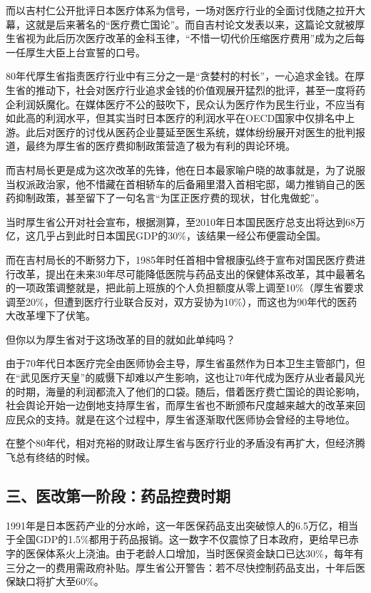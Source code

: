 而以吉村仁公开批评日本医疗体系为信号，一场对医疗行业的全面讨伐随之拉开大幕，这就是后来著名的“医疗费亡国论”。而自吉村论文发表以来，这篇论文就被厚生省视为此后历次医疗改革的金科玉律，“不惜一切代价压缩医疗费用”成为之后每一任厚生大臣上台宣誓的口号。

80年代厚生省指责医疗行业中有三分之一是“贪婪村的村长”，一心追求金钱。在厚生省的推动下，社会对医疗行业追求金钱的价值观展开猛烈的批评，甚至一度将药企利润妖魔化。在媒体医疗不公的鼓吹下，民众认为医疗作为民生行业，不应当有如此高的利润水平，但其实当时日本医疗的利润水平在OECD国家中仅排名中上游。此后对医疗的讨伐从医药企业蔓延至医生系统，媒体纷纷展开对医生的批判报道，最终为厚生省的医疗费抑制政策营造了极为有利的舆论环境。

而吉村局长更是成为这次改革的先锋，他在日本最家喻户晓的故事就是，为了说服当权派政治家，他不惜藏在首相轿车的后备厢里潜入首相宅邸，竭力推销自己的医药抑制政策，甚至留下了一句名言“为匡正医疗费的现状，甘化鬼做蛇”。

当时厚生省公开对社会宣布，根据测算，至2010年日本国民医疗总支出将达到68万亿，这几乎占到此时日本国民GDP的30\%，该结果一经公布便震动全国。

而在吉村局长的不断努力下，1985年时任首相中曾根康弘终于宣布对国民医疗费进行改革，提出在未来30年尽可能降低医院与药品支出的保健体系改革，其中最著名的一项政策调整就是，把此前上班族的个人负担额度从零上调至10\%（厚生省要求调至20\%，但遭到医疗行业联合反对，双方妥协为10\%），而这也为90年代的医药大改革埋下了伏笔。

但你以为厚生省对于这场改革的目的就如此单纯吗？

由于70年代日本医疗完全由医师协会主导，厚生省虽然作为日本卫生主管部门，但在“武见医疗天皇”的威慑下却难以产生影响，这也让70年代成为医疗从业者最风光的时期，海量的利润都流入了他们的口袋。随后，借着医疗费亡国论的舆论影响，社会舆论开始一边倒地支持厚生省，而厚生省也不断颁布尺度越来越大的改革来回应民众的支持。就是在这个过程中，厚生省逐渐取代医师协会曾经的主导地位。

在整个80年代，相对充裕的财政让厚生省与医疗行业的矛盾没有再扩大，但经济腾飞总有终结的时候。

\subsection{三、医改第一阶段：药品控费时期}

1991年是日本医药产业的分水岭，这一年医保药品支出突破惊人的6.5万亿，相当于全国GDP的1.5\%都用于药品报销。这一数字不仅震惊了日本政府，更给早已赤字的医保体系火上浇油。由于老龄人口增加，当时医保资金缺口已达30\%，每年有三分之一的费用需政府补贴。厚生省公开警告：若不尽快控制药品支出，十年后医保缺口将扩大至60\%。


